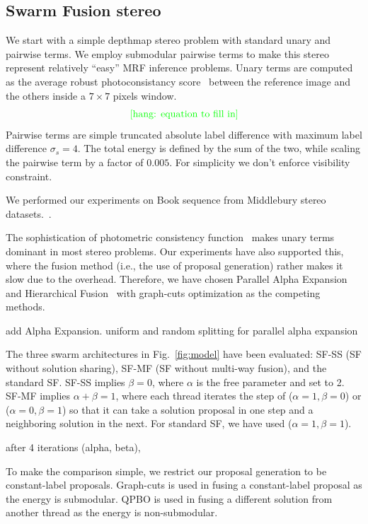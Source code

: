 \subsection{Swarm Fusion stereo}
We start with a simple depthmap stereo problem with standard unary and
pairwise terms. We employ submodular pairwise terms to make this stereo
represent relatively ``easy'' MRF inference problems.
%
Unary terms are computed as the average robust photoconsistancy
score~\cite{woodford} between the reference image and the others inside a $7\times 7$
pixels window.
\begin{equation}
  \text{\textcolor{green}{[hang: {equation to fill in}]}}
\end{equation}
Pairwise terms are simple truncated absolute label
difference with maximum label difference $\sigma_s=4$. The total energy is
defined by the sum of the two, while scaling the pairwise term by a
factor of $0.005$. For simplicity we don't enforce visibility constraint.

%
We performed our experiments on Book sequence from Middlebury stereo datasets.~\cite{middlebury_stereo}.


\noindent The sophistication of photometric consistency
function~\cite{mvs_furukawa_survey} makes unary terms dominant in most
stereo problems.  Our experiments have also supported this, where the
fusion method (i.e., the use of proposal generation) rather makes it slow
due to the overhead.  Therefore, we have chosen Parallel
Alpha Expansion~\cite{delong} and Hierarchical Fusion~\cite{delong,olga}
with graph-cuts optimization as the competing methods.


add Alpha Expansion.
uniform and random splitting for parallel alpha expansion



\noindent The three swarm architectures in Fig.~\ref{fig:model} have
been evaluated: SF-SS (SF without solution sharing), SF-MF (SF without
multi-way fusion), and the standard SF.
%
SF-SS implies $\beta=0$, where $\alpha$ is the free parameter and set to
2. SF-MF implies $\alpha+\beta=1$, where each thread iterates the step
of ($\alpha=1, \beta=0$) or ($\alpha=0, \beta=1$) so that it can take a
solution proposal in one step and a neighboring solution in the
next. For standard SF, we have used ($\alpha=1, \beta=1$).


after 4 iterations (alpha, beta),

%
%
%
%
To make the comparison simple, we restrict our proposal
generation to be constant-label proposals. Graph-cuts is used in fusing
a constant-label proposal as the energy is submodular. QPBO is used in
fusing a different solution from another thread as the energy is
non-submodular.
%
